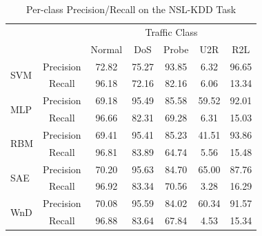 \begin{table}[tbp]
    \centering
    \caption{Per-class Precision/Recall on the NSL-KDD Task}
    \label{CDL:Tab:PrecisionRecall}
    \begin{tabular}{lcccccc}
        \hline
        \hline
                             &            & \multicolumn{5}{c}{Traffic Class} \\
        \cline{3-7}
                             &            & Normal & DoS   & Probe & U2R   & R2L \\
        \hline
        \multirow{2}{*}{SVM} & Precision  & 72.82  & 75.27 & 93.85 &  6.32 & 96.65 \\
                             & Recall     & 96.18  & 72.16 & 82.16 &  6.06 & 13.34 \\
        \cline{1-2}
        \multirow{2}{*}{MLP} & Precision  & 69.18  & 95.49 & 85.58 & 59.52 & 92.01 \\
                             & Recall     & 96.66  & 82.31 & 69.28 &  6.31 & 15.03 \\
        \cline{1-2}
        \multirow{2}{*}{RBM} & Precision  & 69.41  & 95.41 & 85.23 & 41.51 & 93.86 \\
        \cline{2-2}
                             & Recall     & 96.81  & 83.89 & 64.74 &  5.56 & 15.48 \\
        \cline{1-2}
        \multirow{2}{*}{SAE} & Precision  & 70.20  & 95.63 & 84.70 & 65.00 & 87.76 \\
                             & Recall     & 96.92  & 83.34 & 70.56 &  3.28 & 16.29 \\
        \cline{1-2}
        \multirow{2}{*}{WnD} & Precision  & 70.08  & 95.59 & 84.02 & 60.34 & 91.57 \\
                             & Recall     & 96.88  & 83.64 & 67.84 &  4.53 & 15.34 \\
        \hline
    \end{tabular}
\end{table}

